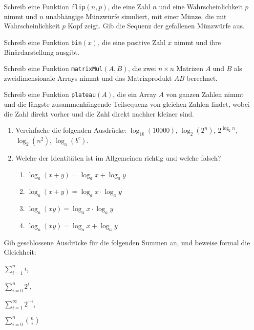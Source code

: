 \documentclass{uebung_cs}
\begin{document}
\begin{aufgabe}
    Schreib eine Funktion \texttt{flip}$(n,p)$, die eine Zahl $n$ und eine Wahrscheinlichkeit $p$ nimmt und $n$ unabhängige Münzwürfe simuliert, mit einer Münze, die mit Wahrscheinlichkeit $p$ Kopf zeigt. Gib die Sequenz der gefallenen Münzwürfe aus.
\end{aufgabe}

\begin{aufgabe}[Binärzahlen]
    Schreib eine Funktion \texttt{bin}$(x)$, die eine positive Zahl $x$ nimmt und ihre Binärdarstellung ausgibt.
\end{aufgabe}

\begin{aufgabe}[Matrixmultiplikation]
    Schreib eine Funktion \texttt{matrixMul}$(A,B)$, die zwei $n\times n$ Matrizen $A$ und $B$ als zweidimensionale Arrays nimmt und das Matrixprodukt $AB$ berechnet.
\end{aufgabe}

\begin{aufgabe}
    Schreib eine Funktion \texttt{plateau}$(A)$, die ein Array $A$ von ganzen Zahlen nimmt und die längste zusammenhängende Teilsequenz von gleichen Zahlen findet, wobei die Zahl direkt vorher und die Zahl direkt nachher kleiner sind.
\end{aufgabe}

\begin{aufgabe}[Logarithmus]\mbox{}
    \begin{enumerate}
        \item Vereinfache die folgenden Ausdrücke:
        $\log_{10}(10000)$,\;
        $\log_2(2^n)$,\;
        $2^{\log_2 n}$,\;
        $\log_2(n^2)$,\;
        $\log_a(b^c)$.
        \item Welche der Identitäten ist im Allgemeinen richtig und welche falsch?
        \begin{enumerate}
            \item $\log_a(x+y)= \log_a x+ \log_a y$
            \item $\log_a(x+y)= \log_a x \cdot \log_a y$
            \item $\log_a(xy)= \log_a x\cdot \log_a y$
            \item $\log_a(xy)= \log_a x+ \log_a y$
        \end{enumerate}
    \end{enumerate}
\end{aufgabe}

\begin{aufgabe}[Summen]
    Gib geschlossene Ausdrücke für die folgenden Summen an, und beweise formal die Gleichheit:
    \begin{enumerate*}
        \item $\sum_{i=1}^n i$,\;
        \item $\sum_{i=0}^n 2^{i}$,\;
        \item $\sum_{i=1}^\infty 2^{-i}$,\;
        \item $\sum_{i=0}^n \binom{n}{i}$
    \end{enumerate*}
\end{aufgabe}
\end{document}
